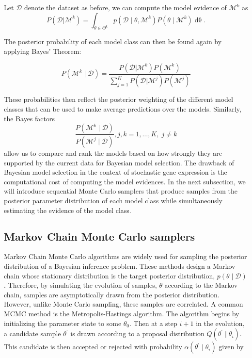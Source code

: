 \documentclass[1p]{article}
\begin{document}
Let $\mathcal{D}$ denote the dataset as before, we can compute the model evidence of $\mathcal{M}^k$ as
\begin{equation}
  P(\mathcal{D} | \mathcal{M}^k)
  =
  \int_{\theta \in \Theta^k}
  {
  p \left (\mathcal{D} \mid \theta,   \mathcal{M}^k \right )P(\theta \mid \mathcal{M}^k)
  \operatorname{d\theta}
  }.
\end{equation}

The posterior probability of each model class can then be found again by applying Bayes' Theorem:

\begin{equation}
P \left (\mathcal{M}^k \mid  \mathcal{D}\right)  = \frac{P(\mathcal{D} | \mathcal{M}^k) P(\mathcal{M}^k)}{\sum_{j=1}^K P(\mathcal{D} | \mathcal{M}^j) P(\mathcal{M}^j)}
\end{equation}

These probabilities then reflect the posterior weighting of the different model classes that can be used to make average predictions over the models. Similarly, the Bayes factors
\begin{equation}
  \frac{P \left (\mathcal{M}^k \mid  \mathcal{D}\right)}
  {P \left (\mathcal{M}^j \mid  \mathcal{D}\right)},
  j, k = 1, \ldots, K, \; j \neq k
\end{equation}
allow us to compare and rank the models based on how strongly they are supported by the current data for Bayesian model selection. The drawback of Bayesian model selection in the context of stochastic gene expression is the computational cost of computing the model evidences. In the next subsection, we will introduce sequential Monte Carlo samplers that produce samples from the posterior parameter distribution of each model class while simultaneously estimating the evidence of the model class.

\subsection{Markov Chain Monte Carlo samplers}

Markov Chain Monte Carlo algorithms are widely used for sampling the posterior distribution of a Bayesian inference problem. These methods design a Markov chain whose stationary distribution is the target posterior distribution, $p \left ( \theta \mid \mathcal{D} \right )$. Therefore, by simulating the evolution of samples, $\theta$ according to the Markov chain, samples are asymptotically drawn from the posterior distribution. However, unlike Monte Carlo sampling, these samples are correlated. A common MCMC method is the Metropolis-Hastings algorithm. The algorithm begins by initializing the parameter state to some $\theta_0$. Then at a step $i+1$ in the evolution, a candidate sample $\theta^\prime$ is drawn according to a proposal distribution $Q \left (\theta^\prime \mid \theta_{i}\right )$. This candidate is then accepted or rejected with probability $\alpha \left (\theta^\prime \mid \theta_i \right )$  given by
\end{document}
